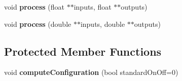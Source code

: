 \begin{DoxyCompactItemize}
\item 
\hypertarget{class_planewaves_ad650c5c26df2c792e17bcd8a36d6ec2b}{void {\bfseries process} (float $\ast$$\ast$inputs, float $\ast$$\ast$outputs)}\label{class_planewaves_ad650c5c26df2c792e17bcd8a36d6ec2b}

\item 
\hypertarget{class_planewaves_ad506efc46b74de7b94e6aa82d8d0248e}{void {\bfseries process} (double $\ast$$\ast$inputs, double $\ast$$\ast$outputs)}\label{class_planewaves_ad506efc46b74de7b94e6aa82d8d0248e}

\end{DoxyCompactItemize}
\subsection*{Protected Member Functions}
\begin{DoxyCompactItemize}
\item 
\hypertarget{class_planewaves_aaf5fc3b55a549b2b1b68c710aafbae68}{void {\bfseries compute\-Configuration} (bool standard\-On\-Off=0)}\label{class_planewaves_aaf5fc3b55a549b2b1b68c710aafbae68}

\end{DoxyCompactItemize}
